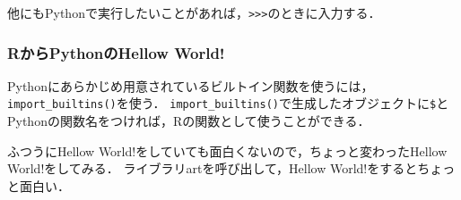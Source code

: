 \documentclass[
]{article}
\newenvironment{Shaded}{\begin{snugshade}}{\end{snugshade}}
\newcommand{\FunctionTok}[1]{\textcolor[rgb]{0.00,0.00,0.00}{#1}}
\newcommand{\NormalTok}[1]{#1}
\newcommand{\OtherTok}[1]{\textcolor[rgb]{0.56,0.35,0.01}{#1}}
\newcommand{\SpecialCharTok}[1]{\textcolor[rgb]{0.00,0.00,0.00}{#1}}
\newcommand{\StringTok}[1]{\textcolor[rgb]{0.31,0.60,0.02}{#1}}
\begin{document}
他にもPythonで実行したいことがあれば，\texttt{\textgreater{}\textgreater{}\textgreater{}}のときに入力する．

\hypertarget{rux304bux3089pythonux306ehellow-world}{%
\subsubsection{RからPythonのHellow World!}\label{rux304bux3089pythonux306ehellow-world}}

Pythonにあらかじめ用意されているビルトイン関数を使うには，\texttt{import\_builtins()}を使う．
\texttt{import\_builtins()}で生成したオブジェクトに\texttt{\$}とPythonの関数名をつければ，Rの関数として使うことができる．

\begin{Shaded}
\end{Shaded}

ふつうにHellow World!をしていても面白くないので，ちょっと変わったHellow World!をしてみる．
ライブラリartを呼び出して，Hellow World!をするとちょっと面白い．
\end{document}
